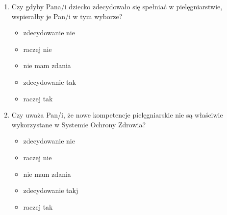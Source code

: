 \documentclass[a4paper,12pt,twoside,openright]{mwrep}
\begin{document}
\begin{enumerate}[label=\arabic*)]
			\item{Czy gdyby Pana/i dziecko zdecydowało się spełniać w pielęgniarstwie, wspierałby je Pan/i  w tym wyborze?}
		\begin{itemize}
			\item{zdecydowanie nie}
			\item{raczej nie}
			\item{nie mam zdania}
			\item{zdecydowanie tak}
			\item{raczej tak}
		\end{itemize}
		\vspace{\baselineskip}
		
			\item{Czy uważa Pan/i, że nowe kompetencje pielęgniarskie nie są właściwie wykorzystane w Systemie Ochrony Zdrowia?}
		\begin{itemize}
			\item{zdecydowanie nie}
			\item{raczej nie}
			\item{nie mam zdania}
			\item{zdecydowanie takj}
			\item{raczej tak}
		\end{itemize}
		\vspace{\baselineskip}
		
		
		
		
\end{enumerate}


\end{document}
